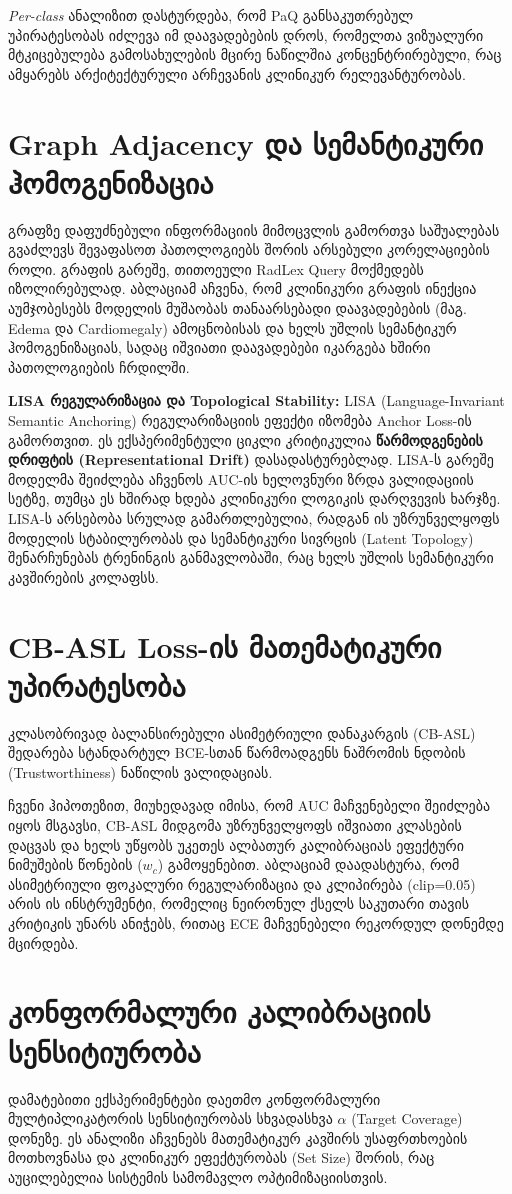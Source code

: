 \documentclass[12pt,a4paper,oneside]{report}
\begin{document}
\textit{Per-class} ანალიზით დასტურდება, რომ PaQ განსაკუთრებულ უპირატესობას იძლევა იმ დაავადებების დროს, რომელთა ვიზუალური მტკიცებულება გამოსახულების მცირე ნაწილშია კონცენტრირებული, რაც ამყარებს არქიტექტურული არჩევანის კლინიკურ რელევანტურობას.

\section{Graph Adjacency და სემანტიკური ჰომოგენიზაცია}
გრაფზე დაფუძნებული ინფორმაციის მიმოცვლის გამორთვა საშუალებას გვაძლევს შევაფასოთ პათოლოგიებს შორის არსებული კორელაციების როლი. გრაფის გარეშე, თითოეული RadLex Query მოქმედებს იზოლირებულად. აბლაციამ აჩვენა, რომ კლინიკური გრაფის ინექცია აუმჯობესებს მოდელის მუშაობას თანაარსებადი დაავადებების (მაგ. Edema და Cardiomegaly) ამოცნობისას და ხელს უშლის სემანტიკურ ჰომოგენიზაციას, სადაც იშვიათი დაავადებები იკარგება ხშირი პათოლოგიების ჩრდილში.

\textbf{LISA რეგულარიზაცია და Topological Stability:} LISA (Language-Invariant Semantic Anchoring) რეგულარიზაციის ეფექტი იზომება Anchor Loss-ის გამორთვით. ეს ექსპერიმენტული ციკლი კრიტიკულია \textbf{წარმოდგენების დრიფტის (Representational Drift)} დასადასტურებლად. LISA-ს გარეშე მოდელმა შეიძლება აჩვენოს AUC-ის ხელოვნური ზრდა ვალიდაციის სეტზე, თუმცა ეს ხშირად ხდება კლინიკური ლოგიკის დარღვევის ხარჯზე. LISA-ს არსებობა სრულად გამართლებულია, რადგან ის უზრუნველყოფს მოდელის სტაბილურობას და სემანტიკური სივრცის (Latent Topology) შენარჩუნებას ტრენინგის განმავლობაში, რაც ხელს უშლის სემანტიკური კავშირების კოლაფსს.

\section{CB-ASL Loss-ის მათემატიკური უპირატესობა}
კლასობრივად ბალანსირებული ასიმეტრიული დანაკარგის (CB-ASL) შედარება სტანდარტულ BCE-სთან წარმოადგენს ნაშრომის ნდობის (Trustworthiness) ნაწილის ვალიდაციას.

ჩვენი ჰიპოთეზით, მიუხედავად იმისა, რომ AUC მაჩვენებელი შეიძლება იყოს მსგავსი, CB-ASL მიდგომა უზრუნველყოფს იშვიათი კლასების დაცვას და ხელს უწყობს უკეთეს ალბათურ კალიბრაციას ეფექტური ნიმუშების წონების ($w_c$) გამოყენებით. აბლაციამ დაადასტურა, რომ ასიმეტრიული ფოკალური რეგულარიზაცია და კლიპირება (clip=0.05) არის ის ინსტრუმენტი, რომელიც ნეირონულ ქსელს საკუთარი თავის კრიტიკის უნარს ანიჭებს, რითაც ECE მაჩვენებელი რეკორდულ დონემდე მცირდება.

\section{კონფორმალური კალიბრაციის სენსიტიურობა}
დამატებითი ექსპერიმენტები დაეთმო კონფორმალური მულტიპლიკატორის სენსიტიურობას სხვადასხვა $\alpha$ (Target Coverage) დონეზე. ეს ანალიზი აჩვენებს მათემატიკურ კავშირს უსაფრთხოების მოთხოვნასა და კლინიკურ ეფექტურობას (Set Size) შორის, რაც აუცილებელია სისტემის სამომავლო ოპტიმიზაციისთვის.
\end{document}
